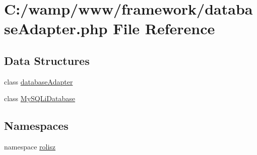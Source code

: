 \hypertarget{database_adapter_8php}{
\section{C:/wamp/www/framework/databaseAdapter.php File Reference}
\label{database_adapter_8php}
}
\subsection*{Data Structures}
\begin{DoxyCompactItemize}
\item 
class \hyperlink{interfacedatabase_adapter}{databaseAdapter}
\item 
class \hyperlink{class_my_s_q_li_database}{MySQLiDatabase}
\end{DoxyCompactItemize}
\subsection*{Namespaces}
\begin{DoxyCompactItemize}
\item 
namespace \hyperlink{namespacerolisz}{rolisz}
\end{DoxyCompactItemize}
